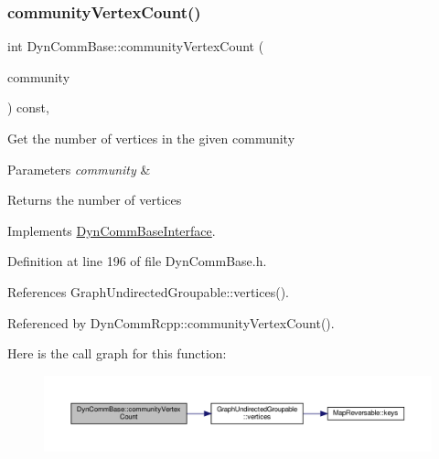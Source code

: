 \subsubsection{\texorpdfstring{community\+Vertex\+Count()}{communityVertexCount()}}
{\footnotesize\ttfamily int Dyn\+Comm\+Base\+::community\+Vertex\+Count (\begin{DoxyParamCaption}\item[{\hyperlink{graphUndirectedGroupable_8h_a914da95c9ea7f14f4b7f875c36818556}{type\+Community}}]{community }\end{DoxyParamCaption}) const\hspace{0.3cm}{\ttfamily [inline]}, {\ttfamily [virtual]}}

Get the number of vertices in the given community


\begin{DoxyParams}{Parameters}
{\em community} & \\
\hline
\end{DoxyParams}
\begin{DoxyReturn}{Returns}
the number of vertices 
\end{DoxyReturn}


Implements \hyperlink{classDynCommBaseInterface_a2b4c4a130a2de5eb6cd79af88969ef3c}{Dyn\+Comm\+Base\+Interface}.



Definition at line 196 of file Dyn\+Comm\+Base.\+h.



References Graph\+Undirected\+Groupable\+::vertices().



Referenced by Dyn\+Comm\+Rcpp\+::community\+Vertex\+Count().

Here is the call graph for this function\+:
\nopagebreak
\begin{figure}[H]
\begin{center}
\leavevmode
\includegraphics[width=350pt]{classDynCommBase_ad02f1853b63e1ceaf24b05cfdbcf7a49_cgraph}
\end{center}
\end{figure}
\mbox{\label{classDynCommBase_a5f7d75431e0f774c1c92f096d6a7c429}} 
